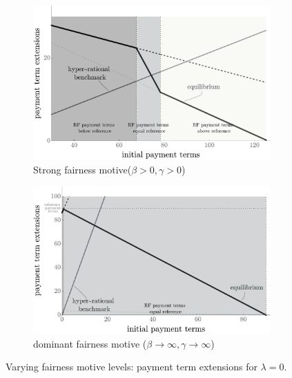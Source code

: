 \documentclass[a4paper,11pt]{article}
\renewcommand{\~}[1]{\tilde{#1}}
\renewcommand{\-}[1]{\overline{#1}}
\begin{document}
\begin{figure}[htb]
     \begin{subfigure}[b]{0.48\textwidth}
         \centering
         \includegraphics[width=\textwidth]{figures/06_ExtensionFairness_1.pdf}
         \caption{Strong fairness motive\newline ($\beta>0, \gamma>0$) \vspace{12pt}}
         \label{fig:delta:fair}
     \end{subfigure}
     \hfill
     \begin{subfigure}[b]{0.48\textwidth}
         \centering
         \includegraphics[width=\textwidth]{figures/06_ExtensionFairness_3.pdf}
         \caption{dominant fairness motive \newline($\beta\rightarrow\infty,\gamma\rightarrow\infty$)\vspace{12pt}}
         \label{fig:delta:fair:full}
     \end{subfigure}
        \caption{Varying fairness motive levels: payment term extensions for $\lambda=0$.}
        \label{fig:delta}
\end{figure}
\end{document}
